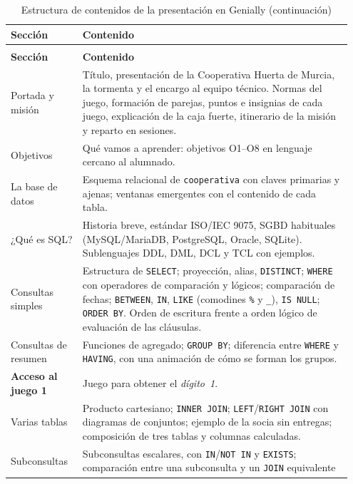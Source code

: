 \documentclass[11pt,a4paper]{article}
\begin{document}
\begin{longtable}{@{}p{0.2\linewidth}p{0.75\linewidth}@{}}
\caption{Estructura de contenidos de la presentación en Genially}
\label{tab:genially}\\
\toprule
\textbf{Sección} & \textbf{Contenido} \\
\midrule
\endfirsthead
\caption[]{Estructura de contenidos de la presentación en Genially (continuación)}\\
\toprule
\textbf{Sección} & \textbf{Contenido} \\
\midrule
\endhead
Portada y misión & Título, presentación de la Cooperativa Huerta de Murcia, la tormenta
y el encargo al equipo técnico. Normas del juego, formación de parejas, puntos e insignias de cada juego,
explicación de la caja fuerte, itinerario de la misión y reparto en sesiones. \\
\addlinespace
Objetivos & Qué vamos a aprender: objetivos O1–O8 en lenguaje cercano al alumnado. \\
\addlinespace
La base de datos & Esquema relacional de \texttt{cooperativa} con claves primarias y
ajenas; ventanas emergentes con el contenido de cada tabla. \\
\addlinespace
¿Qué es SQL? & Historia breve, estándar ISO/IEC 9075, SGBD habituales (MySQL/MariaDB,
PostgreSQL, Oracle, SQLite). Sublenguajes DDL, DML, DCL y TCL con ejemplos. \\
\addlinespace
Consultas simples & Estructura de \texttt{SELECT}; proyección, alias, \texttt{DISTINCT};
\texttt{WHERE} con operadores de comparación y lógicos; comparación de fechas; \texttt{BETWEEN},
\texttt{IN}, \texttt{LIKE} (comodines \texttt{\%} y \texttt{\_}), \texttt{IS NULL}; \texttt{ORDER BY}. Orden de escritura frente a orden lógico
de evaluación de las cláusulas. \\
\addlinespace
Consultas de resumen & Funciones de agregado; \texttt{GROUP BY}; diferencia entre
\texttt{WHERE} y \texttt{HAVING}, con una animación de cómo se forman los grupos. \\
\addlinespace
\textbf{Acceso al juego 1} & Juego para obtener el \emph{dígito~1}. \\
\addlinespace
Varias tablas & Producto cartesiano; \texttt{INNER JOIN}; \texttt{LEFT}/\texttt{RIGHT JOIN}
con diagramas de conjuntos; ejemplo de la socia sin entregas; composición de tres tablas y
columnas calculadas. \\
\addlinespace
Subconsultas & Subconsultas escalares, con \texttt{IN}/\texttt{NOT IN} y
\texttt{EXISTS}; comparación entre una subconsulta y un \texttt{JOIN} equivalente

\end{longtable}
\end{document}
